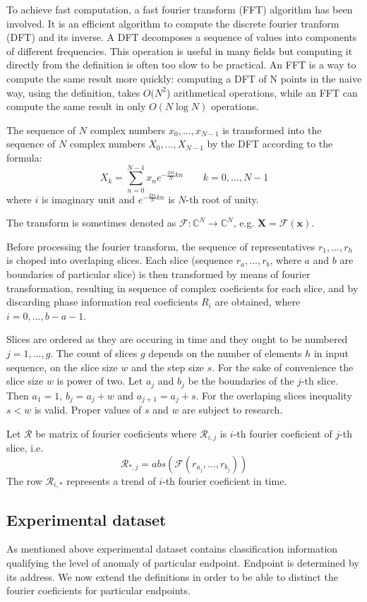 \documentclass[a4paper]{IEEEtran}
\begin{document}
To achieve fast computation, a fast fourier transform (FFT) algorithm 
has been involved.
It is an efficient algorithm to compute the discrete fourier tranform (DFT) and
its inverse.
A DFT decomposes a sequence of values into components of
different frequencies. 
This operation is useful in many fields but computing it directly from the
definition is often too slow to be practical.
An FFT is a way to compute the same result more quickly: 
computing a DFT of N points in the naive way, using the definition, takes
$O(N^2$) arithmetical operations, 
while an FFT can compute the same result in only $ O(N \log N)$ operations.

The sequence of $N$ complex numbers $x_0, ..., x_{N−1}$ is transformed into the
sequence of $N$ complex numbers $X_0, ..., X_{N−1}$ by the DFT according to the
formula:
\[
X_k = \sum_{n=0}^{N-1} x_n e^{-\frac{2 \pi i}{N} k n} \quad \quad k = 0, \dots, N-1
\]
where $i$ is imaginary unit and $e^{-\frac{2 \pi i}{N} k n}$ is $N$-th root of
unity. 

The transform is sometimes denoted as 
$\mathcal{F}\colon\mathbb{C}^N \to \mathbb{C}^N$, e.g.
$\mathbf{X} = \mathcal{F} \left ( \mathbf{x} \right )$.

Before processing the fourier transform, the sequence of representatives 
$r_1, ...,r_h$ is choped into overlaping slices.
Each slice (sequence $r_a, ..., r_b$, where $a$ and $b$ are boundaries
of particular slice) is then transformed by means of fourier transformation,
resulting in sequence of complex coeficients for each slice,
and by discarding phase information real coeficients ${R}_i$ are obtained,
where $i = 0, ..., b-a-1$.

Slices are ordered as they are occuring in time and they ought to be numbered
$j = 1,..., g $. The count of slices $g$ depends on the number of elements $h$
in input sequence, on the slice size $w$ and the step size $s$.
For the sake of convenience the slice size $w$ is power of two.
Let $a_j$ and $b_j$ be the boundaries of the $j$-th slice. Then
$a_1 = 1$, $b_j = a_j + w$ and $a_{j+1} = a_j + s$.
For the overlaping slices inequality $s < w$ is valid.
Proper values of $s$ and $w$ are subject to research.

Let $\mathcal{R}$ be matrix of fourier coeficients where
$\mathcal{R}_{i,j}$ is $i$-th fourier coeficient of $j$-th slice,
i.e. 
\[
\mathcal{R}_{*,j} = abs(\mathcal{F}(r_{a_j}, ..., r_{b_j}))
\]
The row $\mathcal{R}_{i,*}$ represents a trend of $i$-th fourier
coeficient in time.

\subsection{Experimental dataset}
As mentioned above experimental dataset contains classification
information qualifying the level of anomaly of particular endpoint.
Endpoint is
determined by its address. We now extend the definitions in order 
to be able to distinct the fourier coeficients for
particular endpoints.
\end{document}
